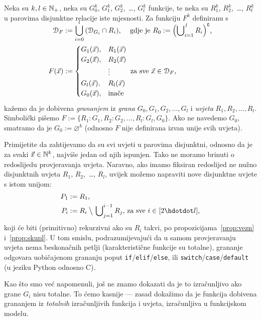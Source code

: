 \begin{definicija}[{name=[grananje]}]\label{def:gr}
Neka su $k,l\in{\mathbb N}_+$, neka su $G_0^k$, $G_1^k$, $G_2^k$,~\ldots, $G_l^k$ funkcije, te neka su $R_1^k$, $R_2^k$,~\ldots, $R_l^k$ u parovima disjunktne relacije iste mjesnosti. Za funkciju $F^k$ definiranu s
\begin{align}
\SwapAboveDisplaySkip
    \dom{F}&:=\bigcup_{i=0}^l\,(\dom{G_i}\cap R_i)\text{, \quad gdje je }
    R_0:=\Bigl(\bigcup\nolimits_{i=1}^{\,l}R_i\Bigr)\kompl\text,\\
    F(\vec x)&:=\begin{cases}
    G_1(\vec x),&R_1(\vec x)\\
    G_2(\vec x),&R_2(\vec x)\\
    &\vdots\\
    G_l(\vec x),&R_l(\vec x)\\
    G_0(\vec x),&\text{inače}
    \end{cases}\text{ za sve $\vec x\in\dom F$,}
\end{align}
kažemo da je dobivena \emph{grananjem} iz \emph{grana} $G_0,G_1,G_2,\dotsc,G_l$ i \emph{uvjeta} $R_1,R_2,\dotsc,R_l$. Simbolički pišemo $F:=\{R_1\colon G_1,R_2\colon G_2,\dotsc,R_l\colon G_l,G_0\}$. Ako ne navedemo $G_0$, smatramo da je $G_0:=\varnothing^k$ (odnosno $F$ nije definirana izvan unije svih uvjeta).
\end{definicija}

Primijetite da zahtijevamo da su svi uvjeti u parovima disjunktni, odnosno da je za svaki $\vec x\in{\mathbb N}^k$, najviše jedan od njih ispunjen. Tako ne moramo brinuti o redoslijedu provjeravanja uvjeta. Naravno, ako imamo fiksiran redoslijed ne nužno disjunktnih uvjeta $R_1$, $R_2$,~\ldots, $R_l$, uvijek možemo napraviti nove disjunktne uvjete s istom unijom:
\begin{align}
    P_1&:=R_1\text,\\
    P_i&:=R_i\mathbin{\big\backslash}\,\bigcup\nolimits_{j=1}^{i-1}R_j\text{, za sve $i\in[2\dd l]$,}
\end{align}
koji će biti (primitivno) rekurzivni ako su $R_i$ takvi, po propozicijama~\ref{prop:vezn} i~\ref{prop:skupl}. U tom smislu, podrazumijevajući da u samom provjeravanju uvjeta nema beskonačnih petlji (karakteristične funkcije su totalne), grananje odgovara uobičajenom grananju poput \texttt{if}/\texttt{elif}/\texttt{else}, ili \texttt{switch}/\texttt{case}/\texttt{default} (u jeziku Python odnosno C).

Kao što smo već napomenuli, još ne znamo dokazati da je to izračunljivo ako grane $G_i$ nisu totalne. To ćemo kasnije --- zasad dokažimo da je funkcija dobivena grananjem iz \emph{totalnih} izračunljivih funkcija i uvjeta, izračunljiva u funkcijskom modelu.

